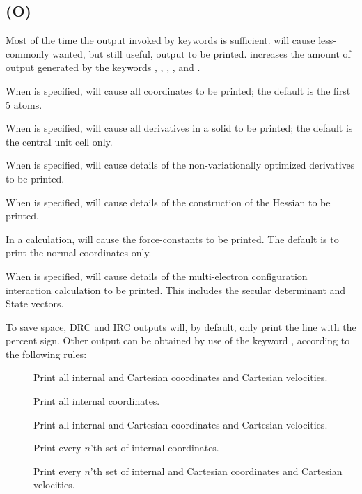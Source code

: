 \subsection*{ (O)}
\label{large}
Most of the time the  output  invoked  by  keywords  is  sufficient.
  will  cause  less-commonly  wanted, but still useful, output to be
printed.    increases the amount of output generated by the keywords
, , , , and .


When  is specified,  will cause all coordinates to be printed;
the default is the first 5 atoms.

When  is specified,  will cause all derivatives in a solid to be
printed; the default is the central unit cell only.

When  is specified,  will cause details of the non-variationally
optimized derivatives to be printed.

When  is specified,  will cause details of the construction of the
Hessian to be printed.

In a  calculation,  will cause the force-constants to be printed.
The default is to print the normal coordinates only.

When  is specified,  will cause details of the multi-electron
configuration interaction calculation to be printed.  This includes the
secular determinant and State vectors.

To save space, DRC and IRC outputs will, by default, only  print  the
line  with  the percent sign.  Other output can be obtained by use of the
keyword , according to the following rules:
\begin{description}
\item[] Print all internal and Cartesian coordinates
                and Cartesian velocities.
\item[]  Print all internal coordinates.
\item[] Print all internal and Cartesian coordinates
and Cartesian velocities.
\item[] Print every $n$'th set of internal coordinates.
\item[] Print every $n$'th set of internal and Cartesian
                 coordinates and Cartesian velocities.
\end{description}

